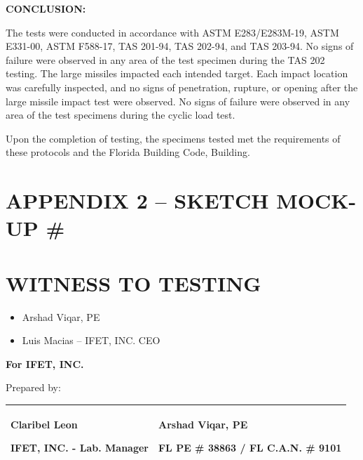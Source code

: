 \textbf{CONCLUSION:}

The tests were conducted in accordance with ASTM E283/E283M-19, ASTM
E331-00, ASTM F588-17, TAS 201-94, TAS 202-94, and TAS 203-94. No signs
of failure were observed in any area of the test specimen during the TAS
202 testing. The large missiles impacted each intended target. Each
impact location was carefully inspected, and no signs of penetration,
rupture, or opening after the large missile impact test were observed.
No signs of failure were observed in any area of the test specimens
during the cyclic load test.

Upon the completion of testing, the specimens tested met the
requirements of these protocols and the Florida Building Code, Building.

\hypertarget{appendix-2-sketch-mock-up}{%
\section{\texorpdfstring{\textbf{APPENDIX 2 -- SKETCH MOCK-UP \#}
}{APPENDIX 2 -- SKETCH MOCK-UP \# }}\label{appendix-2-sketch-mock-up}}

\hypertarget{section-4}{%
\section{\texorpdfstring{\hfill\break
}{ }}\label{section-4}}

\hypertarget{witness-to-testing}{%
\section{\texorpdfstring{\textbf{WITNESS TO
TESTING}}{WITNESS TO TESTING}}\label{witness-to-testing}}

\begin{itemize}
\item
  Arshad Viqar, PE
\item
  Luis Macias -- IFET, INC. CEO
\end{itemize}

\textbf{For IFET, INC.}

Prepared by:

\begin{longtable}[]{@{}ll@{}}
\toprule
\endhead
\begin{minipage}[t]{0.47\columnwidth}\raggedright
\textbf{Claribel Leon}

IFET, INC. - Lab. Manager\strut
\end{minipage} & \begin{minipage}[t]{0.47\columnwidth}\raggedright
\textbf{Arshad Viqar, PE}

FL PE \# 38863 / FL C.A.N. \# 9101\strut
\end{minipage}\tabularnewline
\bottomrule
\end{longtable}

